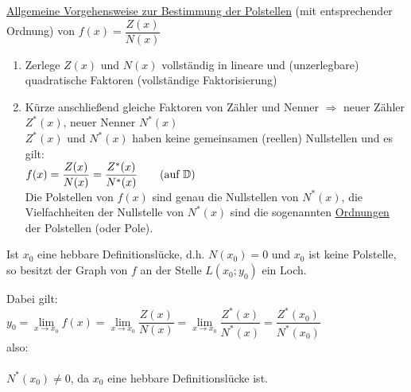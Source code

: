 
\ul{Allgemeine Vorgehensweise zur Bestimmung der Polstellen}
(mit entsprechender Ordnung) von $f(x)=\dfrac{Z(x)}{N(x)}$
\begin{enumerate}
	\item Zerlege $Z(x)$ und $N(x)$ vollständig in lineare und (unzerlegbare) quadratische Faktoren (vollständige Faktorisierung)
	\item Kürze anschließend gleiche Faktoren von Zähler und Nenner $\Rightarrow$ neuer Zähler $Z^*(x)$, neuer Nenner $N^*(x)$\\
	$Z^*(x)$ und $N^*(x)$ haben keine gemeinsamen (reellen) Nullstellen und es gilt:\\
	$f(x)=\dfrac{Z(x)}{N(x)} = \dfrac{Z^*(x)}{N^*(x)}\qquad (\text{auf }\mathbb{D})$\\
	Die Polstellen von $f(x)$ sind genau die Nullstellen von $N^*(x)$, die Vielfachheiten der Nullstelle von $N^*(x)$ sind die sogenannten \ul{Ordnungen} der Polstellen (oder Pole).
\end{enumerate}

\Bem Ist $x_0$ eine hebbare Definitionslücke, d.h. $N(x_0)=0$ und $x_0$ ist keine Polstelle, so besitzt der Graph von $f$ an der Stelle $L(x_0;y_0)$ ein {\flqq Loch\frqq}.

Dabei gilt:\\
$y_0=\lim\limits_{x\to x_0}f(x)=\lim\limits_{x\to x_0}\dfrac{Z(x)}{N(x)}=\lim\limits_{x\to x_0}\dfrac{Z^*(x)}{N^*(x)}=\dfrac{Z^*(x_0)}{N^*(x_0)}$\\
also:\\
\\
$N^*(x_0)\ne0$, da $x_0$ eine hebbare Definitionslücke ist.

